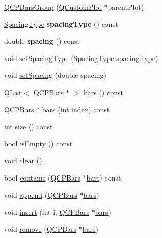 \begin{DoxyCompactItemize}
\item 
\hyperlink{classQCPBarsGroup_aa4e043b9a22c6c5ea0f93740aca063e1}{Q\+C\+P\+Bars\+Group} (\hyperlink{classQCustomPlot}{Q\+Custom\+Plot} $\ast$parent\+Plot)
\item 
\mbox{\label{classQCPBarsGroup_a894a77c45325aad2e742d936bc1f8aea}} 
\hyperlink{classQCPBarsGroup_a4c0521120a97e60bbca37677a37075b6}{Spacing\+Type} {\bfseries spacing\+Type} () const
\item 
\mbox{\label{classQCPBarsGroup_a314d09aeb2ad209518b9183ca7ffe662}} 
double {\bfseries spacing} () const
\item 
void \hyperlink{classQCPBarsGroup_a2c7e2d61b10594a4555b615e1fcaf49e}{set\+Spacing\+Type} (\hyperlink{classQCPBarsGroup_a4c0521120a97e60bbca37677a37075b6}{Spacing\+Type} spacing\+Type)
\item 
void \hyperlink{classQCPBarsGroup_aa553d327479d72a0c3dafcc724a190e2}{set\+Spacing} (double spacing)
\item 
Q\+List$<$ \hyperlink{classQCPBars}{Q\+C\+P\+Bars} $\ast$ $>$ \hyperlink{classQCPBarsGroup_a6e4f4e86abbec6a9342f204ef82abef8}{bars} () const
\item 
\hyperlink{classQCPBars}{Q\+C\+P\+Bars} $\ast$ \hyperlink{classQCPBarsGroup_a0754d659a020aa7fddfe81e657ce2d92}{bars} (int index) const
\item 
int \hyperlink{classQCPBarsGroup_a3780ec77919cb00840207ec7a0f00dd5}{size} () const
\item 
bool \hyperlink{classQCPBarsGroup_aac959e79e852e8ef9aea6e0449ad000a}{is\+Empty} () const
\item 
void \hyperlink{classQCPBarsGroup_a3ddf23928c6cd89530bd34ab7ba7b177}{clear} ()
\item 
bool \hyperlink{classQCPBarsGroup_ae26da07a23553052a178fb3fae90d0dc}{contains} (\hyperlink{classQCPBars}{Q\+C\+P\+Bars} $\ast$\hyperlink{classQCPBarsGroup_a6e4f4e86abbec6a9342f204ef82abef8}{bars}) const
\item 
void \hyperlink{classQCPBarsGroup_a809ed63cc4ff7cd5b0b8c96b470163d3}{append} (\hyperlink{classQCPBars}{Q\+C\+P\+Bars} $\ast$\hyperlink{classQCPBarsGroup_a6e4f4e86abbec6a9342f204ef82abef8}{bars})
\item 
void \hyperlink{classQCPBarsGroup_a309a5f7233db189f3ea9c2d04ece6c13}{insert} (int i, \hyperlink{classQCPBars}{Q\+C\+P\+Bars} $\ast$\hyperlink{classQCPBarsGroup_a6e4f4e86abbec6a9342f204ef82abef8}{bars})
\item 
void \hyperlink{classQCPBarsGroup_a215e28a5944f1159013a0e19169220e7}{remove} (\hyperlink{classQCPBars}{Q\+C\+P\+Bars} $\ast$\hyperlink{classQCPBarsGroup_a6e4f4e86abbec6a9342f204ef82abef8}{bars})
\end{DoxyCompactItemize}
